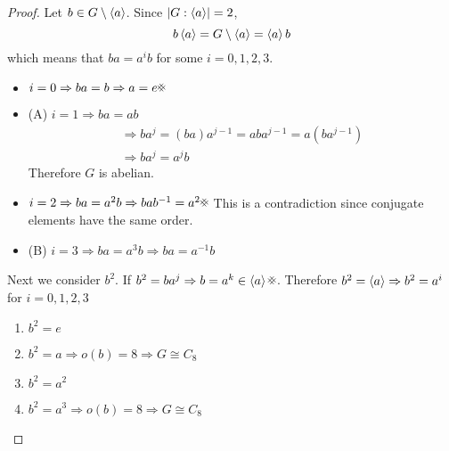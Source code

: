 \documentclass{article}
\begin{document}
\begin{proof}
    Let $b \in G \setminus \left\langle a\right\rangle$. Since $\left\lvert G : \left\langle a\right\rangle\right\rvert = 2$, 
    \[
        b \left\langle a\right\rangle = G \setminus \left\langle a\right\rangle = \left\langle a\right\rangle b  
    \]
    which means that $ba = a^i b$ for some $i = 0, 1, 2, 3$.
    \begin{itemize}
        \item $i = 0 \Rightarrow ba = b \Rightarrow a = e \contradiction$
        \item (A) $i = 1 \Rightarrow ba = ab$
        \begin{align*}
            \Rightarrow ba^j = (ba) a^{j - 1} = ab a^{j - 1} = a (ba^{j - 1}) \\
            \Rightarrow ba^j = a^j b \tag{By Induction}
        \end{align*}
        Therefore $G$ is abelian.
        \item $i = 2 \Rightarrow ba = a^2b \Rightarrow bab^{-1} = a^2 \contradiction$
        This is a contradiction since conjugate elements have the same order.
        \item (B) $i = 3 \Rightarrow ba = a^3b \Rightarrow ba = a^{-1}b$
    \end{itemize}

    Next we consider $b^2$. If $b^2 = ba^j \Rightarrow b = a^k \in \anglebk{a} \contradiction$.
    Therefore $b^2 = \left\langle a\right\rangle \Rightarrow b^2 = a^i$ for $i = 0, 1, 2, 3$
    \begin{enumerate}
        \item $b^2 = e$
        \item $b^2 = a \Rightarrow o(b) = 8 \Rightarrow G \cong C_8$
        \item $b^2 = a^2$
        \item $b^2 = a^3 \Rightarrow o(b) = 8 \Rightarrow G \cong C_8$
    \end{enumerate}


\end{proof}
\end{document}

